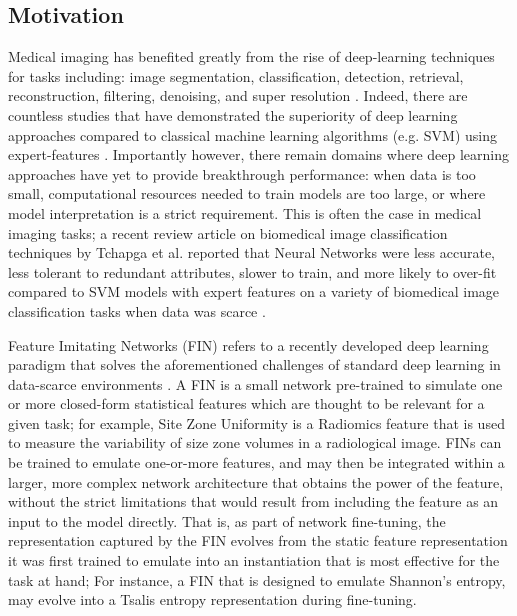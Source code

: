 \documentclass{article}
\begin{document}
\subsection{Motivation}
Medical imaging has benefited greatly from the rise of deep-learning techniques for tasks including: image segmentation, classification, detection, retrieval, reconstruction, filtering, denoising, and super resolution \cite{8657645}. Indeed, there are countless studies that have demonstrated the superiority of deep learning approaches compared to classical machine learning algorithms (e.g. SVM) using expert-features \cite{8241753}. Importantly however, there remain domains where deep learning approaches have yet to provide breakthrough performance: when data is too small, computational resources needed to train models are too large, or where model interpretation is a strict requirement. This is often the case in medical imaging tasks; a recent review article on biomedical image classification techniques by Tchapga et al. reported that Neural Networks were less accurate, less tolerant to redundant attributes, slower to train, and more likely to over-fit compared to SVM models with expert features on a variety of biomedical image classification tasks when data was scarce \cite{tchito2021biomedical}. 

Feature Imitating Networks (FIN) refers to a recently developed deep learning paradigm that solves the aforementioned challenges of standard deep learning in data-scarce environments \cite{saba2022feature}. A FIN is a small network pre-trained to simulate one or more closed-form statistical features which are thought to be relevant for a given task; for example, Site Zone Uniformity is a Radiomics feature \cite{lambin2012radiomics} that is used to measure the variability of size zone volumes in a radiological image. FINs can be trained to emulate one-or-more
features, and may then be integrated within a larger, more complex
network architecture that obtains the power of the feature, without
the strict limitations that would result from including the feature
as an input to the model directly. That is, as part of network
fine-tuning, the representation captured by the FIN evolves from the
static feature representation it was first trained to emulate into an
instantiation that is most effective for the task at hand; For instance,
a FIN that is designed to emulate Shannon’s entropy, may evolve
into a Tsalis entropy representation during fine-tuning.
\end{document}
